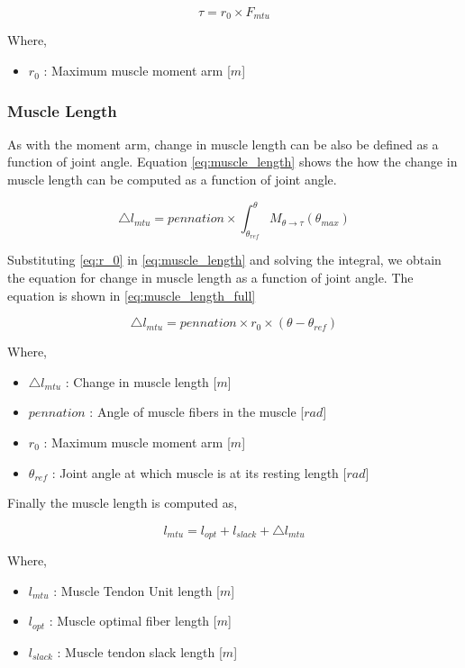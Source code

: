 \documentclass{cmc}
\begin{document}
\begin{equation}
  \label{eq:moment_arm_simple}
  \tau = r_0 \times F_{mtu}
\end{equation}

Where,
\begin{itemize}
\item $r_0$ : Maximum muscle moment arm [$m$]
\end{itemize}

\subsubsection*{Muscle Length}
\label{sec:muscle-length}

As with the moment arm, change in muscle length can be also be defined
as a function of joint angle. Equation \ref{eq:muscle_length} shows
the how the change in muscle length can be computed as a function of
joint angle.

\begin{equation}
  \label{eq:muscle_length}
  \triangle l_{mtu} = pennation \times \int^{\theta}_{\theta_{ref}} M_{\theta \rightarrow \tau}(\theta_{max})
\end{equation}

Substituting \ref{eq:r_0} in \ref{eq:muscle_length} and solving the
integral, we obtain the equation for change in muscle length as a
function of joint angle. The equation is shown in
\ref{eq:muscle_length_full}

\begin{equation}
  \label{eq:muscle_length_full}
  \triangle l_{mtu} = pennation \times r_0 \times (\theta - \theta_{ref})
\end{equation}

Where,
\begin{itemize}
\item $\triangle l_{mtu}$ : Change in muscle length [$m$]
\item $pennation$ : Angle of muscle fibers in the muscle [$rad$]
\item $r_0$ : Maximum muscle moment arm [$m$]
\item $\theta_{ref}$ : Joint angle at which muscle is at its resting
  length [$rad$]
\end{itemize}

Finally the muscle length is computed as,

\begin{equation}
  \label{eq:muscle_tendon_length}
  l_{mtu} = l_{opt} + l_{slack} + \triangle l_{mtu}
\end{equation}

Where,
\begin{itemize}
\item $l_{mtu}$ : Muscle Tendon Unit length [$m$]
\item $l_{opt}$ : Muscle optimal fiber length [$m$]
\item $l_{slack}$ : Muscle tendon slack length [$m$]
\end{itemize}
\end{document}
